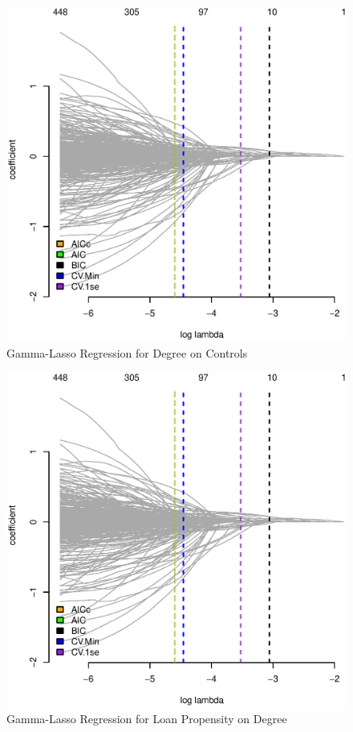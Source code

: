 \documentclass[11pt, fleqn]{article}
\begin{document}
\begin{figure}[!htb]
  \centering
  \includegraphics[scale=.5]{treat_aic.eps}
  \caption{Gamma-Lasso Regression for Degree on Controls}
  \label{fig:treat_aic}
\end{figure}



\begin{figure}[!htb]
  \centering
  \includegraphics[scale=.5]{treat_aic.eps}
  \caption{Gamma-Lasso Regression for Loan Propensity on Degree}
  \label{fig:causal_aic}
\end{figure}
\end{document}
